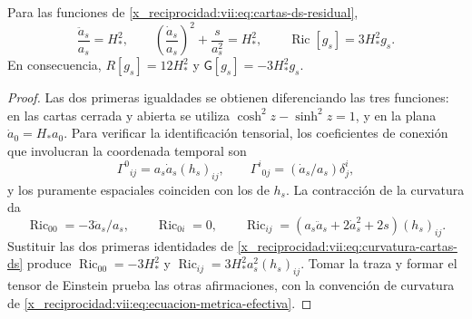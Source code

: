 \begin{lemma}
\label{x_reciprocidad:vii:lem:curvatura-cartas-ds}
Para las funciones de \eqref{x_reciprocidad:vii:eq:cartas-ds-residual},
\begin{equation}
 \frac{\ddot a_s}{a_s}=H_*^2,\qquad
 \left(\frac{\dot a_s}{a_s}\right)^2+\frac{s}{a_s^2}=H_*^2,
 \qquad
 \operatorname{Ric}[g_s]=3H_*^2g_s.
 \label{x_reciprocidad:vii:eq:curvatura-cartas-ds}
\end{equation}
En consecuencia, \(R[g_s]=12H_*^2\) y
\(\mathsf G[g_s]=-3H_*^2g_s\).
\end{lemma}
\begin{proof}
Las dos primeras igualdades se obtienen diferenciando las tres funciones:
en las cartas cerrada y abierta se utiliza
\(\cosh^2z-\sinh^2z=1\), y en la plana
\(\dot a_0=H_*a_0\). Para verificar la identificación tensorial,
los coeficientes de conexión que involucran la coordenada temporal son
\[
 \Gamma^0{}_{ij}=a_s\dot a_s(h_s)_{ij},\qquad
 \Gamma^i{}_{0j}=(\dot a_s/a_s)\delta^i_j,
\]
y los puramente espaciales coinciden con los de \(h_s\).
La contracción de la curvatura da
\[
 \operatorname{Ric}_{00}=-3\ddot a_s/a_s,\qquad
 \operatorname{Ric}_{0i}=0,\qquad
 \operatorname{Ric}_{ij}
  =(a_s\ddot a_s+2\dot a_s^2+2s)(h_s)_{ij}.
\]
Sustituir las dos primeras identidades de
\eqref{x_reciprocidad:vii:eq:curvatura-cartas-ds} produce
\(\operatorname{Ric}_{00}=-3H_*^2\) y
\(\operatorname{Ric}_{ij}=3H_*^2a_s^2(h_s)_{ij}\).
Tomar la traza y formar el tensor de Einstein prueba las otras
afirmaciones, con la convención de curvatura de
\eqref{x_reciprocidad:vii:eq:ecuacion-metrica-efectiva}.
\end{proof}

